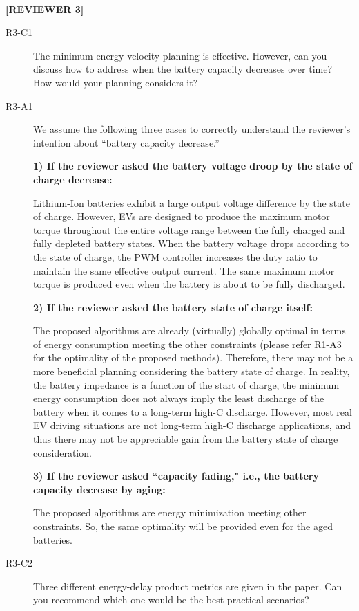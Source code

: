\documentclass[onecolumn]{IEEEconf}
\begin{document}
~
\newpage

\textbf{[REVIEWER 3]}
\begin{description}

\item [R3-C1] The minimum energy velocity planning is effective. However, can you discuss how to address when the battery capacity decreases over time? How would your planning considers it?

\item [R3-A1] We assume the following three cases to correctly understand  the reviewer's intention about ``battery capacity decrease.''

\textbf{1) If the reviewer asked the battery voltage droop by the state of charge decrease:}

Lithium-Ion batteries exhibit a large output voltage difference by the state of charge. However, EVs are designed to produce the maximum motor torque throughout  the entire voltage range between the fully charged and fully depleted battery states. When the battery voltage drops according to the state of charge, the PWM controller increases the duty ratio to maintain the same effective output current. The same maximum motor torque is produced even when the battery is about to be fully discharged.

\textbf{2) If the reviewer asked the battery state of charge itself:}

The proposed  algorithms are already (virtually) globally optimal in terms of energy consumption meeting the other constraints (please refer R1-A3 for the optimality of the proposed methods). Therefore, there may not be a more beneficial planning considering the battery state of charge. In reality, the battery impedance is a function of the start of charge, the minimum energy consumption does not always imply the least discharge of the battery when it comes to a long-term high-C discharge. However, most real EV driving situations are not  long-term high-C discharge applications, and thus there may not be appreciable gain from the battery state of charge consideration.

\textbf{3) If the reviewer asked ``capacity fading," i.e., the battery capacity decrease by aging:}

The proposed algorithms are energy minimization meeting other constraints. So, the same optimality will be provided even for the aged batteries. 

\item [R3-C2] Three different energy-delay product metrics are given in the paper. Can you recommend which one would be the best practical scenarios?


\end{description}
\end{document}
